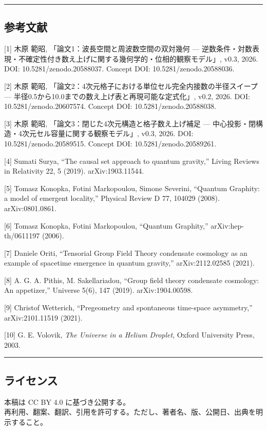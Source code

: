 \documentclass[
]{ltjsarticle}
\begin{document}
\begin{center}\rule{0.5\linewidth}{0.5pt}\end{center}

\subsection{参考文献}\label{ux53c2ux8003ux6587ux732e}

{[}1{]} 木原 範昭, 「論文1：波長空間と周波数空間の双対幾何 ---
逆数条件・対数表現・不確定性付き数え上げに関する幾何学的・位相的観察モデル」,
v0.3, 2026. DOI: 10.5281/zenodo.20588037. Concept DOI:
10.5281/zenodo.20588036.

{[}2{]} 木原 範昭,
「論文2：4次元格子における単位セル完全内接数の半径スイープ ---
半径0.5から10.0までの数え上げ表と再現可能な定式化」, v0.2, 2026. DOI:
10.5281/zenodo.20607574. Concept DOI: 10.5281/zenodo.20588038.

{[}3{]} 木原 範昭, 「論文3：閉じた4次元構造と格子数え上げ補足 ---
中心投影・閉構造・4次元セル容量に関する観察モデル」, v0.3, 2026. DOI:
10.5281/zenodo.20589515. Concept DOI: 10.5281/zenodo.20589261.

{[}4{]} Sumati Surya, ``The causal set approach to quantum gravity,''
Living Reviews in Relativity 22, 5 (2019). arXiv:1903.11544.

{[}5{]} Tomasz Konopka, Fotini Markopoulou, Simone Severini, ``Quantum
Graphity: a model of emergent locality,'' Physical Review D 77, 104029
(2008). arXiv:0801.0861.

{[}6{]} Tomasz Konopka, Fotini Markopoulou, ``Quantum Graphity,''
arXiv:hep-th/0611197 (2006).

{[}7{]} Daniele Oriti, ``Tensorial Group Field Theory condensate
cosmology as an example of spacetime emergence in quantum gravity,''
arXiv:2112.02585 (2021).

{[}8{]} A. G. A. Pithis, M. Sakellariadou, ``Group field theory
condensate cosmology: An appetizer,'' Universe 5(6), 147 (2019).
arXiv:1904.00598.

{[}9{]} Christof Wetterich, ``Pregeometry and spontaneous time-space
asymmetry,'' arXiv:2101.11519 (2021).

{[}10{]} G. E. Volovik, \emph{The Universe in a Helium Droplet}, Oxford
University Press, 2003.

\begin{center}\rule{0.5\linewidth}{0.5pt}\end{center}

\subsection{ライセンス}\label{ux30e9ux30a4ux30bbux30f3ux30b9}

本稿は CC BY 4.0 に基づき公開する。\\
再利用、翻案、翻訳、引用を許可する。ただし、著者名、版、公開日、出典を明示すること。
\end{document}
